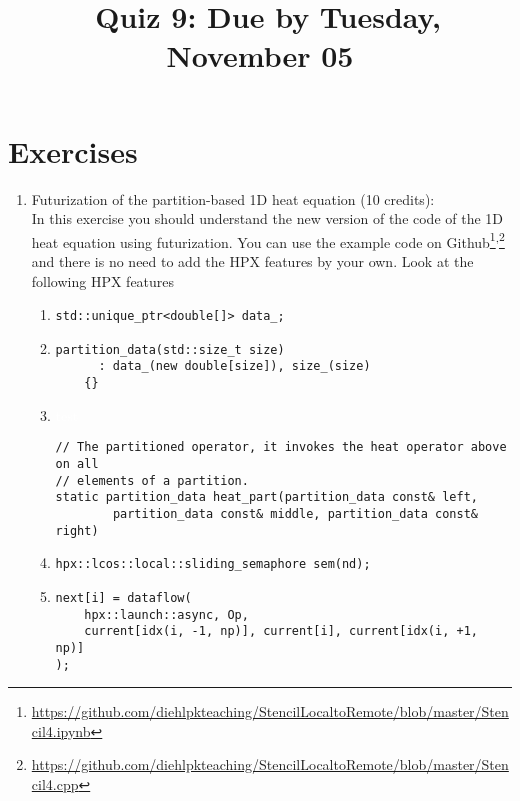 \documentclass[11pt]{article}
\begin{document}
\title{\coursename~Quiz 9: Due by Tuesday, November 05}
\date{}
\maketitle

\medskip


\section*{Exercises}

\begin{enumerate}
\item Futurization of the partition-based 1D heat equation (10 credits): \\
In this exercise you should understand the new version of the code of the 1D heat equation using futurization. You can use the example code on Github\footnote{\url{https://github.com/diehlpkteaching/StencilLocaltoRemote/blob/master/Stencil4.ipynb}}\textsuperscript{,}\footnote{\url{https://github.com/diehlpkteaching/StencilLocaltoRemote/blob/master/Stencil4.cpp}} and there is no need to add the HPX features by your own. Look at the following HPX features
\begin{enumerate}
\item \lstinline|std::unique_ptr<double[]> data_;|
\item \begin{lstlisting}
partition_data(std::size_t size)
      : data_(new double[size]), size_(size)
    {}
\end{lstlisting} 
\item \textcolor{white}{test}

\begin{lstlisting}
// The partitioned operator, it invokes the heat operator above on all
// elements of a partition.
static partition_data heat_part(partition_data const& left,
        partition_data const& middle, partition_data const& right)
\end{lstlisting}

\item \lstinline|hpx::lcos::local::sliding_semaphore sem(nd);|

\item \begin{lstlisting}
next[i] = dataflow(
    hpx::launch::async, Op,
    current[idx(i, -1, np)], current[i], current[idx(i, +1, np)]
);
\end{lstlisting}


\end{enumerate}
\end{enumerate}
\end{document}
